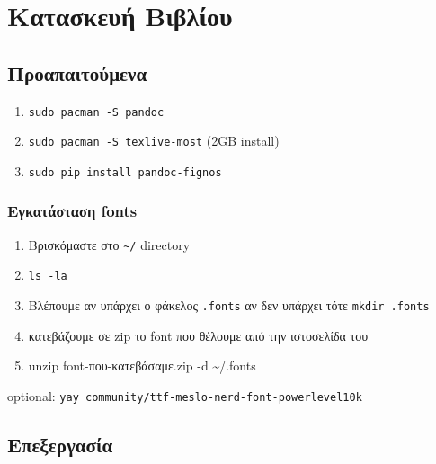 \hypertarget{ux3baux3b1ux3c4ux3b1ux3c3ux3baux3b5ux3c5ux3ae-ux3b2ux3b9ux3b2ux3bbux3afux3bfux3c5}{%
\section{Κατασκευή
Βιβλίου}\label{ux3baux3b1ux3c4ux3b1ux3c3ux3baux3b5ux3c5ux3ae-ux3b2ux3b9ux3b2ux3bbux3afux3bfux3c5}}

\hypertarget{ux3c0ux3c1ux3bfux3b1ux3c0ux3b1ux3b9ux3c4ux3bfux3cdux3bcux3b5ux3bdux3b1}{%
\subsection{Προαπαιτούμενα}\label{ux3c0ux3c1ux3bfux3b1ux3c0ux3b1ux3b9ux3c4ux3bfux3cdux3bcux3b5ux3bdux3b1}}

\begin{enumerate}
\def\labelenumi{\arabic{enumi}.}
\tightlist
\item
  \texttt{sudo\ pacman\ -S\ pandoc}
\item
  \texttt{sudo\ pacman\ -S\ texlive-most} (2GB install)
\item
  \texttt{sudo\ pip\ install\ pandoc-fignos}
\end{enumerate}

\hypertarget{ux3b5ux3b3ux3baux3b1ux3c4ux3acux3c3ux3c4ux3b1ux3c3ux3b7-fonts}{%
\subsubsection{Εγκατάσταση
fonts}\label{ux3b5ux3b3ux3baux3b1ux3c4ux3acux3c3ux3c4ux3b1ux3c3ux3b7-fonts}}

\begin{enumerate}
\def\labelenumi{\arabic{enumi}.}
\tightlist
\item
  Βρισκόμαστε στο \texttt{\textasciitilde{}/} directory
\item
  \texttt{ls\ -la}
\item
  Βλέπουμε αν υπάρχει ο φάκελος \texttt{.fonts} αν δεν υπάρχει τότε
  \texttt{mkdir\ .fonts}
\item
  κατεβάζουμε σε zip το font που θέλουμε από την ιστοσελίδα του
\item
  unzip font-που-κατεβάσαμε.zip -d \textasciitilde/.fonts
\end{enumerate}

optional: \texttt{yay\ community/ttf-meslo-nerd-font-powerlevel10k}

\hypertarget{ux3b5ux3c0ux3b5ux3beux3b5ux3c1ux3b3ux3b1ux3c3ux3afux3b1}{%
\subsection{Επεξεργασία}\label{ux3b5ux3c0ux3b5ux3beux3b5ux3c1ux3b3ux3b1ux3c3ux3afux3b1}}

